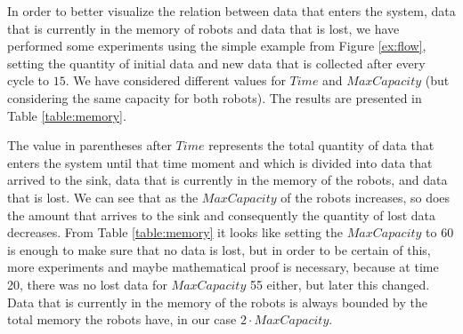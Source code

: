 In order to better visualize the relation between data that enters the system, data that is currently in the memory of robots and data that is lost, we have performed some experiments using the simple example from Figure \ref{ex:flow}, setting the quantity of initial data and new data that is collected after every cycle to $15$. We have considered different values for $Time$ and $MaxCapacity$ (but considering the same capacity for both robots). The results are presented in Table \ref{table:memory}.

The value in parentheses after $Time$ represents the total quantity of data that enters the system until that time moment and which is divided into data that arrived to the sink, data that is currently in the memory of the robots, and data that is lost. We can see that as the $MaxCapacity$ of the robots increases, so does the amount that arrives to the sink and consequently the quantity of lost data decreases. From Table \ref{table:memory} it looks like setting the $MaxCapacity$ to 60 is enough to make sure that no data is lost, but in order to be certain of this, more experiments and maybe mathematical proof is necessary, because at time 20, there was no lost data for $MaxCapacity$ 55 either, but later this changed. Data that is currently in the memory of the robots is always bounded by the total memory the robots have, in our case $2 \cdot MaxCapacity$.

